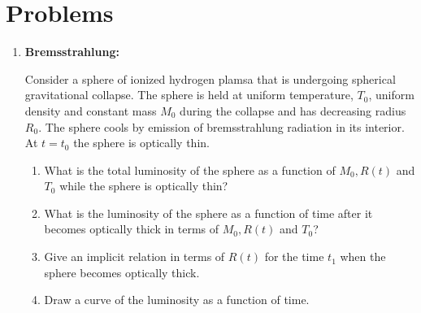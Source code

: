 \section{Problems}
\begin{enumerate}
\item{\bf Bremsstrahlung:}

Consider a sphere of ionized hydrogen plamsa that is undergoing
spherical gravitational collapse.  The sphere is held at uniform
temperature, $T_0$, uniform density and constant mass $M_0$ during the
collapse and has decreasing radius $R_0$.  The sphere cools by
emission of bremsstrahlung radiation in its interior.  At $t=t_0$ the
sphere is optically thin.
\begin{enumerate}
\item What is the total luminosity of the sphere as a function of
  $M_0, R(t)$ and $T_0$ while the sphere is optically thin?
\item
What is the luminosity of the sphere as a function of time after it
becomes optically thick in terms of $M_0, R(t)$ and $T_0$?
\item
Give an implicit relation in terms of $R(t)$ for the time $t_1$ when
the sphere becomes optically thick.
\item
Draw a curve of the luminosity as a function of time.
\end{enumerate}
\end{enumerate}

